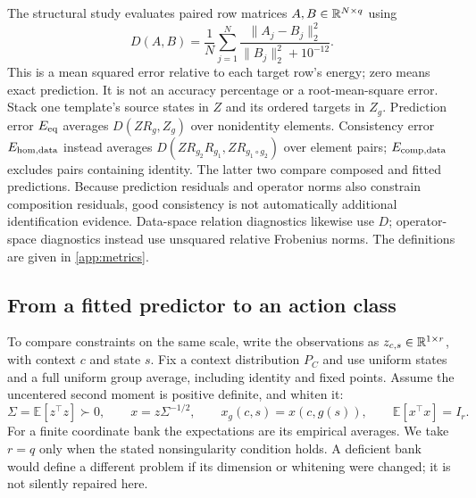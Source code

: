 The structural study evaluates paired row matrices $A,B\in\mathbb{R}^{N\times q}$ using
\begin{equation}
 D(A,B)=\frac1N\sum_{j=1}^{N}
 \frac{\|A_j-B_j\|_2^2}{\|B_j\|_2^2+10^{-12}}.
 \label{eq:D}
\end{equation}
This is a mean squared error relative to each target row's energy; zero means exact prediction. It is not an accuracy percentage or a root-mean-square error. Stack one template's source states in $Z$ and its ordered targets in $Z_g$. Prediction error $E_{\mathrm{eq}}$ averages $D(ZR_g,Z_g)$ over nonidentity elements. Consistency error $E_{\mathrm{hom,data}}$ instead averages $D(ZR_{g_2}R_{g_1},ZR_{g_1\circ g_2})$ over element pairs; $E_{\mathrm{comp,data}}$ excludes pairs containing identity. The latter two compare composed and fitted predictions. Because prediction residuals and operator norms also constrain composition residuals, good consistency is not automatically additional identification evidence. Data-space relation diagnostics likewise use $D$; operator-space diagnostics instead use unsquared relative Frobenius norms. The definitions are given in \cref{app:metrics}.

\subsection{From a fitted predictor to an action class}
To compare constraints on the same scale, write the observations as $z_{c,s}\in\mathbb{R}^{1\times r}$, with context $c$ and state $s$. Fix a context distribution $P_C$ and use uniform states and a full uniform group average, including identity and fixed points. Assume the uncentered second moment is positive definite, and whiten it:
\[
 \Sigma=\mathbb E[z^\top z]\succ0,\qquad
 x=z\Sigma^{-1/2},\qquad x_g(c,s)=x(c,g(s)),\qquad
 \mathbb E[x^\top x]=I_r.
\]
For a finite coordinate bank the expectations are its empirical averages. We take $r=q$ only when the stated nonsingularity condition holds. A deficient bank would define a different problem if its dimension or whitening were changed; it is not silently repaired here.

